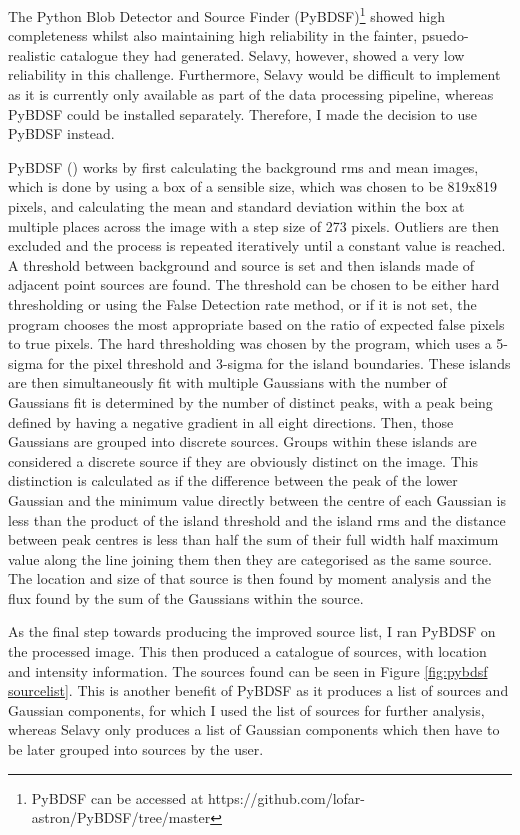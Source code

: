 The Python Blob Detector and Source Finder (PyBDSF)\footnote{PyBDSF can be accessed at https://github.com/lofar-astron/PyBDSF/tree/master} showed high completeness whilst also maintaining high reliability in the fainter, psuedo-realistic catalogue they had generated. Selavy, however, showed a very low reliability in this challenge. Furthermore, Selavy would be difficult to implement as it is currently only available as part of the data processing pipeline, whereas PyBDSF could be installed separately. Therefore, I made the decision to use PyBDSF instead.

PyBDSF (\cite{PyBDSF}) works by first calculating the background rms and mean images, which is done by using a box of a sensible size, which was chosen to be 819x819 pixels, and calculating the mean and standard deviation within the box at multiple places across the image with a step size of 273 pixels. Outliers are then excluded and the process is repeated iteratively until a constant value is reached. A threshold between background and source is set and then islands made of adjacent point sources are found. The threshold can be chosen to be either hard thresholding or using the False Detection rate method, or if it is not set, the program chooses the most appropriate based on the ratio of expected false pixels to true pixels. The hard thresholding was chosen by the program, which uses a 5-sigma for the pixel threshold and 3-sigma for the island boundaries. These islands are then simultaneously fit with multiple Gaussians with the number of Gaussians fit is determined by the number of distinct peaks, with a peak being defined by having a negative gradient in all eight directions. Then, those Gaussians are grouped into discrete sources. Groups within these islands are considered a discrete source if they are obviously distinct on the image. This distinction is calculated as if the difference between the peak of the lower Gaussian and the minimum value directly between the centre of each Gaussian is less than the product of the island threshold and the island rms and the distance between peak centres is less than half the sum of their full width half maximum value along the line joining them then they are categorised as the same source. The location and size of that source is then found by moment analysis %
and the flux found by the sum of the Gaussians within the source.

As the final step towards producing the improved source list, I ran PyBDSF on the processed image. This then produced a catalogue of sources, with location and intensity information. The sources found can be seen in Figure \ref{fig:pybdsf sourcelist}. This is another benefit of PyBDSF as it produces a list of sources and Gaussian components, for which I used the list of sources for further analysis, whereas Selavy only produces a list of Gaussian components which then have to be later grouped into sources by the user.

